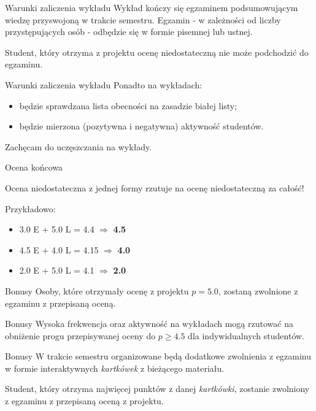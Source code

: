 \begin{frame}{Warunki zaliczenia wykładu}
	Wykład kończy się egzaminem podsumowującym wiedzę przyswojoną w trakcie semestru. Egzamin - w zależności od liczby przystępujących osób - odbędzie się w formie pisemnej lub ustnej.
	
	Student, który otrzyma z projektu ocenę niedostateczną nie może podchodzić do egzaminu.
\end{frame}

\begin{frame}{Warunki zaliczenia wykładu}	
	Ponadto na wykładach:
	\begin{itemize}
		\item będzie sprawdzana lista obecności na zasadzie białej listy;
		\item będzie mierzona (pozytywna i negatywna) aktywność studentów.
	\end{itemize}
	
	Zachęcam do uczęszczania na wykłady.
\end{frame}

\begin{frame}{Ocena końcowa}
	\begin{figure}
	\end{figure}
	
	Ocena niedostateczna z jednej formy rzutuje na ocenę niedostateczną za całość!
	
	Przykładowo:
	\begin{itemize}
		\item 3.0 E + 5.0 L = 4.4 $\Rightarrow$ \textbf{4.5}
		\item 4.5 E + 4.0 L = 4.15 $\Rightarrow$ \textbf{4.0}
		\item 2.0 E + 5.0 L = 4.1 $\Rightarrow$ \textbf{2.0}
	\end{itemize}
\end{frame}

\begin{frame}{Bonusy}	
	Osoby, które otrzymały ocenę z projektu \textbf{$p = 5.0$}, zostaną zwolnione z egzaminu z przepisaną oceną.
\end{frame}

\begin{frame}{Bonusy}	
	Wysoka frekwencja oraz aktywność na wykładach mogą rzutować na obniżenie progu przepisywanej oceny do $p \geq 4.5$ dla indywidualnych studentów.
\end{frame}

\begin{frame}{Bonusy}		
	W trakcie semestru organizowane będą dodatkowe zwolnienia z egzaminu w formie interaktywnych \emph{kartkówek} z bieżącego materiału.
	
	Student, który otrzyma najwięcej punktów z danej \emph{kartkówki}, zostanie zwolniony z egzaminu z przepisaną oceną z projektu.
\end{frame}


